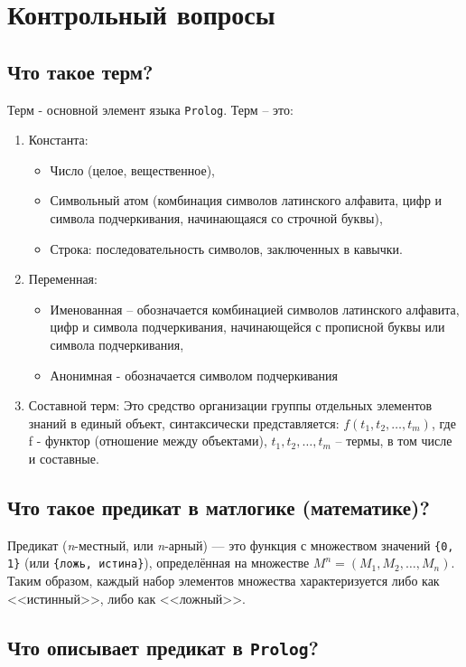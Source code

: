 \chapter{Контрольный вопросы}

\section{Что такое терм?}

Терм - основной элемент языка \texttt{Prolog}. Терм – это:
\begin{enumerate}
	\item Константа: 
	\begin{itemize}
		\item Число (целое, вещественное),
		\item Символьный атом (комбинация символов латинского алфавита, цифр и символа подчеркивания, начинающаяся со строчной буквы),
		\item Строка: последовательность символов, заключенных в кавычки.
	\end{itemize}
	\item Переменная:
	\begin{itemize}
		\item Именованная – обозначается комбинацией символов латинского алфавита, цифр и символа подчеркивания, начинающейся с прописной буквы или символа подчеркивания,
		\item Анонимная  - обозначается символом подчеркивания
	\end{itemize}
	\item Составной терм:
	Это средство организации группы отдельных элементов знаний в единый  объект,  синтаксически представляется: $f(t_1, t_2, \dots, t_m)$, где f -  функтор (отношение между объектами), $t_1, t_2, \dots, t_m$ – термы, в том  числе  и составные.
\end{enumerate}

\section{Что такое предикат в матлогике (математике)?}

Предикат (\textit{n}-местный, или \textit{n}-арный) --- это функция с множеством значений \texttt{\{0, 1\}} (или \texttt{\{ложь, истина\}}), определённая на множестве $M^n = (M_1, M_2, \ldots, M_n)$. Таким образом, каждый набор элементов множества характеризуется либо как <<истинный>>, либо как <<ложный>>.

\section{Что описывает предикат в \texttt{Prolog}?}


